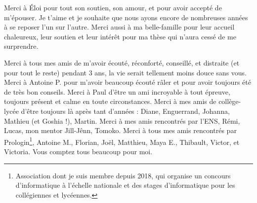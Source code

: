Merci à Éloi pour tout son soutien, son amour, et pour avoir accepté de m’épouser. Je t’aime et je souhaite que nous ayons encore de nombreuses années à se reposer l’un sur l’autre. Merci aussi à ma belle-famille pour leur accueil chaleureux, leur soutien et leur intérêt pour ma thèse qui n’aura cessé de me surprendre.


Merci à tous mes amis de m’avoir écouté, réconforté, conseillé, et distraite (et pour tout le reste) pendant 3 ans, la vie serait tellement moins douce sans vous.
Merci à Antoine P. pour m’avoir beaucoup écouté râler et pour avoir toujours été de très bon conseils. Merci à Paul d’être un ami incroyable à tout épreuve, toujours présent et calme en toute circonstances. Merci à mes amis de collège-lycée d’être toujours là après tant d’années : Diane, Enguerrand, Johanna, Mathieu (et Goshia !), Martin. Merci à mes amis rencontrés par l’ENS, Rémi, Lucas, mon mentor Jill-Jênn, Tomoko. Merci à tous mes amis rencontrés par Prologin\footnote{Association dont je suis membre depuis 2018, qui organise un concours d’informatique à l’échelle nationale et des stages d’informatique pour les collégiennes et lycéennes.}, Antoine M., Florian, Joël, Matthieu, Maya E., Thibault, Victor, et Victoria. Vous comptez tous beaucoup pour moi.
